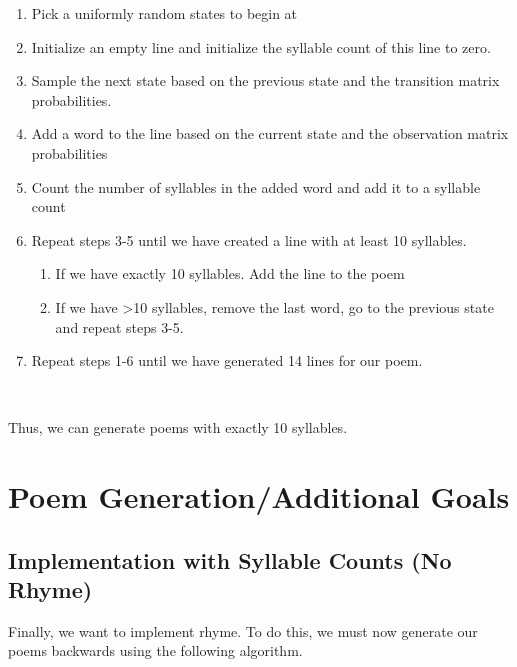 \begin{enumerate}

\item Pick a uniformly random states to begin at

\item Initialize an empty line and initialize the syllable count of this line to zero.

\item Sample the next state based on the previous state and the transition matrix probabilities.

\item Add a word to the line based on the current state and the observation matrix probabilities

\item Count the number of syllables in the added word and add it to a syllable count

\item Repeat steps 3-5 until we have created a line with at least 10 syllables. 

\begin{enumerate}

\item If we have exactly 10 syllables. Add the line to the poem

\item If we have \textgreater 10 syllables, remove the last word, go to the previous state and repeat steps 3-5.

\end{enumerate}

\item Repeat steps 1-6 until we have generated 14 lines for our poem.

\end{enumerate}
~

Thus, we can generate poems with exactly 10 syllables.

\section*{Poem Generation/Additional Goals}

\subsection*{Implementation with Syllable Counts (No Rhyme)}

Finally, we want to implement rhyme. To do this, we must now generate our poems backwards using the following algorithm. 

